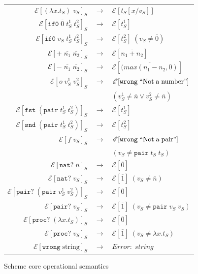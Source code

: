\begin{figure}
\onehalfspacing
\begin{center}
\begin{tabular}{rcl}
$\mathscr{E}[(\lambda x.t_{S})\;v_{S}]_{S}$ & $\rightarrow$ & $\mathscr{E}[t_{S}[x/v_{S}]]$ \\
$\mathscr{E}[\mathtt{if0}\;\overline{0}\;t_{S}^{1}\;t_{S}^{2}]_{S}$ & $\rightarrow$ & $\mathscr{E}[t_{S}^{1}]$ \\
$\mathscr{E}[\mathtt{if0}\;v_{S}\;t_{S}^{1}\;t_{S}^{2}]_{S}$ & $\rightarrow$ & $\mathscr{E}[t_{S}^{2}]\;(v_{S}\neq\overline{0})$ \\
$\mathscr{E}[+\;\overline{n_{1}}\;\overline{n_{2}}]_{S}$ & $\rightarrow$ & $\mathscr{E}[\overline{n_{1}+n_{2}}]$ \\
$\mathscr{E}[-\;\overline{n_{1}}\;\overline{n_{2}}]_{S}$ & $\rightarrow$ & $\mathscr{E}[\overline{(max(n_{1}-n_{2},0)}]$ \\
$\mathscr{E}[o\;v_{S}^{1}\;v_{S}^{2}]_{S}$ & $\rightarrow$ & $\mathscr{E}[\mathtt{wrong}\;\mathrm{``Not\;a\;number"}]$ \\
&& $(v_{S}^{1}\neq\overline{n}\vee v_{S}^{2}\neq\overline{n})$ \\
$\mathscr{E}[\mathtt{fst}\;(\mathtt{pair}\;t_{S}^{1}\;t_{S}^{2})]_{S}$ & $\rightarrow$ & $\mathscr{E}[t_{S}^{1}]$ \\
$\mathscr{E}[\mathtt{snd}\;(\mathtt{pair}\;t_{S}^{1}\;t_{S}^{2})]_{S}$ & $\rightarrow$ & $\mathscr{E}[t_{S}^{2}]$ \\
$\mathscr{E}[f\;v_{S}]_{S}$ & $\rightarrow$ & $\mathscr{E}[\mathtt{wrong}\;\mathrm{``Not\;a\;pair"}]$ \\
&& $(v_{S}\neq\mathtt{pair}\;t_{S}\;t_{S})$ \\
$\mathscr{E}[\mathtt{nat?}\;\overline{n}]_{S}$ & $\rightarrow$ & $\mathscr{E}[\overline{0}]$ \\
$\mathscr{E}[\mathtt{nat?}\;v_{S}]_{S}$ & $\rightarrow$ & $\mathscr{E}[\overline{1}]\;(v_{S}\neq\overline{n})$ \\
$\mathscr{E}[\mathtt{pair?}\;(\mathtt{pair}\;v_{S}^{1}\;v_{S}^{2})]_{S}$ & $\rightarrow$ & $\mathscr{E}[\overline{0}]$ \\
$\mathscr{E}[\mathtt{pair?}\;v_{S}]_{S}$ & $\rightarrow$ & $\mathscr{E}[\overline{1}]\;(v_{S}\neq\mathtt{pair}\;v_{S}\;v_{S})$ \\
$\mathscr{E}[\mathtt{proc?}\;(\lambda x.t_{S})]_{S}$ & $\rightarrow$ & $\mathscr{E}[\overline{0}]$ \\
$\mathscr{E}[\mathtt{proc?}\;v_{S}]_{S}$ & $\rightarrow$ & $\mathscr{E}[\overline{1}]\;(v_{S}\neq\lambda x.t_{S})$ \\
$\mathscr{E}[\mathtt{wrong}\;\mathrm{string}]_{S}$ & $\rightarrow$ & $Error:\;string$
\end{tabular}
\end{center}
\caption{Scheme core operational semantics}
\label{fig:scos}
\end{figure}